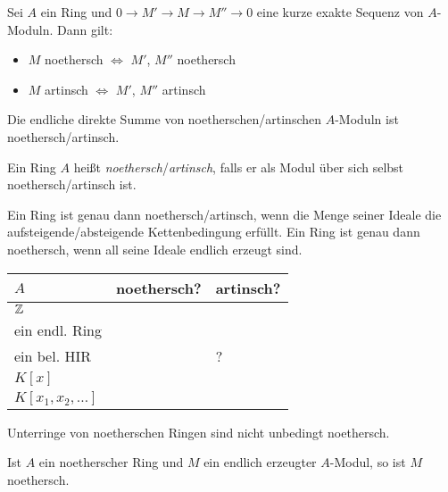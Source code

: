 \documentclass{cheat-sheet}
\newcommand{\cmark}{\ding{51}}
\newcommand{\xmark}{\ding{55}}
\begin{document}
\begin{prop}
  Sei $A$ ein Ring und $0 \to M' \to M \to M'' \to 0$ eine kurze exakte Sequenz von $A$-Moduln.
  Dann gilt:
  \begin{itemize}
    \item $M$ noethersch $\iff$ $M'$, $M''$ noethersch
    \item $M$ artinsch $\iff$ $M'$, $M''$ artinsch
  \end{itemize}
\end{prop}

\begin{kor}
  Die endliche direkte Summe von noetherschen/artinschen $A$-Moduln ist noethersch/artinsch.
\end{kor}


\begin{defn}
  Ein Ring $A$ heißt \emph{noethersch}/\emph{artinsch}, falls er als Modul über sich selbst noethersch/artinsch ist.
\end{defn}

\begin{bem}
  Ein Ring ist genau dann noethersch/artinsch, wenn die Menge seiner Ideale die aufsteigende/absteigende Kettenbedingung erfüllt.
  Ein Ring ist genau dann noethersch, wenn all seine Ideale endlich erzeugt sind.
\end{bem}

\begin{bspe}
  \begin{minipage}[t]{0.88 \linewidth}
    \begin{tabular}[t]{l | l | l}
      $A$ & noethersch? & artinsch? \\ \hline
      $\mathbb{Z}$ & \cmark & \xmark \\
      ein endl. Ring & \cmark & \cmark \\
      ein bel. HIR & \cmark & ? \\
      $K[x]$ & \cmark & \xmark \\
      $K[x_1, x_2, \ldots]$ & \xmark & \xmark
    \end{tabular}
  \end{minipage}
\end{bspe}

\begin{acht}
  Unterringe von noetherschen Ringen sind nicht unbedingt noethersch.
\end{acht}

\begin{prop}
  Ist $A$ ein noetherscher Ring und $M$ ein endlich erzeugter $A$-Modul, so ist $M$ noethersch.
\end{prop}
\end{document}
